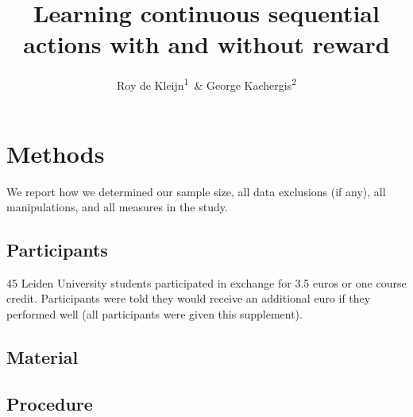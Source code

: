 \documentclass[man]{apa6}
\title{Learning continuous sequential actions with and without reward}
\author{Roy de Kleijn\textsuperscript{1}~\& George Kachergis\textsuperscript{2}}
\date{}
\affiliation{
\vspace{0.5cm}
\textsuperscript{1} Leiden University\\\textsuperscript{2} Stanford University}
\begin{document}
\maketitle

\hypertarget{methods}{%
\section{Methods}\label{methods}}

We report how we determined our sample size, all data exclusions (if any), all manipulations, and all measures in the study.

\hypertarget{participants}{%
\subsection{Participants}\label{participants}}

45 Leiden University students participated in exchange for 3.5 euros or one course credit. Participants were told they would receive an additional euro if they performed well (all participants were given this supplement).

\hypertarget{material}{%
\subsection{Material}\label{material}}

\hypertarget{procedure}{%
\subsection{Procedure}\label{procedure}}
\end{document}
